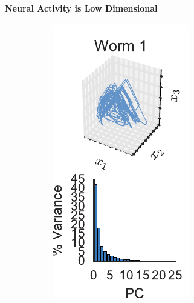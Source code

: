 \documentclass{article}
\begin{document}
\paragraph{Neural Activity is Low Dimensional}

\begin{figure}[t]
  \centering%
  \begin{subfigure}[b]{.19\linewidth}
    \includegraphics[width=\textwidth]{pca_trajectory_worm0.pdf}

\end{subfigure}
\end{figure}
\end{document}
